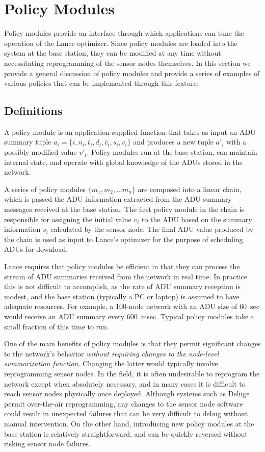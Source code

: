\section{Policy Modules}
\label{sec-policies}

Policy modules provide an interface through 
which applications can tune the operation of the Lance optimizer.
Since policy modules are loaded into the system
at the base station, they can be modified at any time without 
necessitating reprogramming of the sensor nodes themselves.
In this section we provide a general discussion of policy modules and
provide a series of examples of various policies that can be implemented
through this feature. 

\subsection{Definitions}

A policy module is an application-supplied function that takes as input an
ADU summary tuple $a_i = \{ i, n_i, t_i, d_i, \bar{c}_i, s_i, v_i \}$ and
produces a new tuple $a'_i$ with a possibly modified value $v'_i$.  Policy
modules run at the base station, can maintain internal state, and operate
with global knowledge of the ADUs stored in the network. 

A series of policy modules $\{m_1, m_2, ... m_n\}$ are composed into a 
linear chain, which is passed the 
ADU information extracted from the ADU summary messages received at
the base station. The first policy module in the chain is responsible
for assigning the initial value $v_i$ to the ADU based on the summary 
information $s_i$ calculated by the sensor node. 
The final ADU value produced by the chain is used as input to 
Lance's optimizer for the purpose of scheduling ADUs for download.

Lance requires that policy modules be efficient in that
they can process the stream of ADU summaries received from the
network in real time. In practice this is not difficult to accomplish,
as the rate of ADU summary reception is modest, and the base
station (typically a PC or laptop) is assumed to have adequate
resources. For example, a 100-node network with an ADU size of 60~sec 
would receive an ADU summary every 600~msec. Typical policy modules
take a small fraction of this time to run. 

One of the main benefits of policy modules is that they permit 
significant changes to the network's behavior {\em without requiring
changes to the node-level summarization function}. Changing the
latter would typically involve reprogramming sensor nodes. 
In the field, it is often undesirable to reprogram the network 
except when absolutely necessary, and in many cases it is difficult to 
reach sensor nodes physically once deployed. Although systems such as 
Deluge~\cite{deluge} permit over-the-air reprogramming, 
any changes to the sensor node software could result in unexpected
failures that can be very difficult to debug without manual intervention. 
On the other hand, introducing new policy modules at the base station 
is relatively straightforward, and can be quickly reversed without 
risking sensor node failures. 

